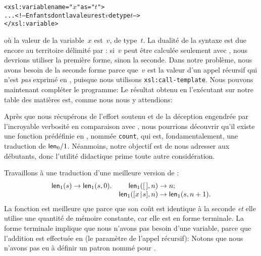 \begin{alltt}
\small<xsl:variable name="\(x\)" as="\(t\)">
  ... <!-- Enfants dont la valeur est \(v\) de type \(t\) -->
</xsl:variable>
\end{alltt}
où la valeur de la variable~\(x\) est~\(v\), de type~\(t\). La dualité
de la syntaxe est due encore au territoire délimité par \XPath:
si~\(v\) peut être calculée seulement avec \XPath, nous devrions
utiliser la première forme, sinon la seconde. Dans notre problème,
nous avons besoin de la seconde forme parce que~\(v\) est la valeur
d'un appel récursif qui n'est \emph{pas} exprimé en \XPath, puisque
nous utilisons \texttt{xsl:call-template}. Nous pouvons maintenant
compléter le programme: 
\noindent Le résultat obtenu en l'exécutant sur notre table des
matières est, comme nous nous y attendions:

Après que nous récupérons de l'effort soutenu et de la déception
engendrée par l'incroyable verbosité en comparaison avec \Erlang, nous
pourrions découvrir qu'il existe une fonction prédéfinie en \XPath,
nommée \texttt{count}, qui est, fondamentalement, une traduction de
\(\textsf{len}_0/1\). Néanmoins, notre objectif est de nous adresser aux
débutants, donc l'utilité didactique prime toute autre considération.

Travaillons à une traduction d'une meilleure version de
:
\begin{equation*}
\begin{array}{@{}r@{\;}l@{\;}lr@{\;}l@{\;}l@{}}
\fun{len}_1(s) & \rightarrow & \fun{len}_1(s,0). &
\fun{len}_1(\el,n) & \rightarrow & n;\\
&&& \fun{len}_1(\cons{x}{s},n) & \rightarrow & \fun{len}_1(s,n+1).
\end{array}
\end{equation*}
La fonction  est meilleure que 
parce que son coût est identique à la seconde \emph{et} elle utilise
une quantité de mémoire constante, car elle est en forme terminale.
La forme terminale implique que nous n'avons pas besoin d'une
variable, parce que l'addition est effectuée en \XPath (le paramètre
de l'appel récursif):
\noindent Notons que nous n'avons pas eu à définir un patron
nommé pour .

